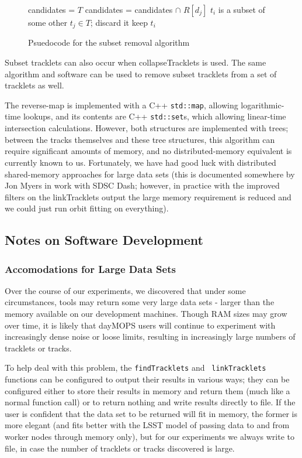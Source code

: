 \begin{figure}[h!]
\hrulefill
\begin{algorithmic}[5]
  \State candidates = $T$
    \State candidates = candidates $\cap$ $R[d_j]$
  \EndFor
    \State $t_i$ is a subset of some other $t_j \in T$; discard it
  \Else 
    \State keep $t_i$
  \EndIf
\EndFor
\end{algorithmic}
\hrulefill
\caption[subsetRemoval pseudocode.]{Psuedocode for the subset removal algorithm}
\label{subsetRemovalAlgorithm}
\end{figure}

Subset tracklets can also occur when collapseTracklets is used.  The
same algorithm and software can be used to remove subset tracklets
from a set of tracklets as well.

The reverse-map is implemented with a C++ {\tt std::map}, allowing
logarithmic-time lookups, and its contents are C++ {\tt std::set}s,
which allowing linear-time intersection calculations.  However, both
structures are implemented with trees; between the tracks themselves
and these tree structures, this algorithm can require significant
amounts of memory, and no distributed-memory equivalent is currently
known to us.  Fortunately, we have had good luck with distributed
shared-memory approaches for large data sets (this is documented
somewhere by Jon Myers in work with SDSC Dash; however, in practice
with the improved filters on the linkTracklets output the large memory
requirement is reduced and we could just run orbit fitting on
everything). 


\subsection{Notes on Software Development}

\subsubsection{Accomodations for Large Data Sets}
\label{largeData}
Over the course of our experiments, we discovered that under some
circumstances, tools may return some very large data sets - larger
than the memory available on our development machines.  Though RAM
sizes may grow over time, it is likely that dayMOPS users will
continue to experiment with increasingly dense noise or loose limits,
resulting in increasingly large numbers of tracklets or tracks.

To help deal with this problem, the {\tt findTracklets} and {\tt
linkTracklets} functions can be configured to output their results in
various ways; they can be configured either to store their results in
memory and return them (much like a normal function call) or to return
nothing and write results directly to file.  If the user is confident
that the data set to be returned will fit in memory, the former is
more elegant (and fits better with the LSST model of passing data to
and from worker nodes through memory only), but for our experiments we
always write to file, in case the number of tracklets or tracks
discovered is large. 

